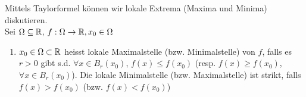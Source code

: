 \noindent Mittels Taylorformel können wir lokale Extrema (Maxima und Minima) diskutieren. \\

\noindent Sei $\Omega\subseteq\mathbb{R}$, $f:\Omega\to\mathbb{R}, x_0\in\Omega$

\begin{definition}{5.38}
\begin{enumerate}
\item $x_0\in\Omega\subset\mathbb{R}$ heisst lokale Maximalstelle (bzw. Minimalstelle) von $f$, falls es $r>0$ gibt s.d. $\forall x\in B_r(x_0)$, $f(x)\leq f(x_0)$ (resp. $f(x)\geq f(x_0)$, $\forall x\in B_r(x_0)$). Die lokale Minimalstelle (bzw. Maximalstelle) ist strikt, falls $f(x)>f(x_0)$ (bzw. $f(x)<f(x_0)$)
\end{enumerate}

\end{definition}